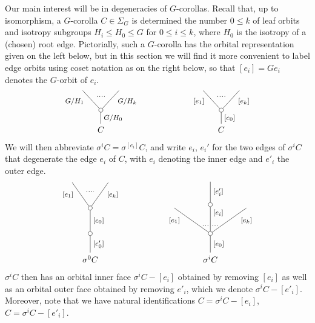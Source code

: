 \documentclass[a4paper,10pt
,draft
]{article}%
\renewcommand{\1}{\eta}%
\begin{document}
Our main interest will be in degeneracies of $G$-corollas. Recall that, up to isomorphism, 
a $G$-corolla $C \in \Sigma_G$ is determined the number $0 \leq k$ of leaf orbits
and isotropy subgroups
$H_i \leq H_0 \leq G$ for $0 \leq i \leq k$,
where $H_0$ is the isotropy of a (chosen) root edge.
Pictorially, such a $G$-corolla has the orbital representation given on the left below,
but in this section we will find it more convenient to label edge orbits using coset notation as on the right below,
so that $[e_i] = G e_i$ denotes the $G$-orbit of $e_i$.
\[
\begin{tikzpicture}
[grow=up,auto,level distance=2.3em,every node/.style = {font=\footnotesize},dummy/.style={circle,draw,inner sep=0pt,minimum size=1.75mm}]
	\node at (0,0) [font=\normalsize]{$C$}
		child{node [dummy] {}
			child{
			edge from parent node [swap,near end] {$G/H_k$} node [name=Kn] {}}
			child{
			edge from parent node [near end] {$G/H_1$}
node [name=Kone,swap] {}}
		edge from parent node [swap] {$G/H_0$}
		};
		\draw [dotted,thick] (Kone) -- (Kn) ;
	\node at (5,0) [font=\normalsize]{$C$}
		child{node [dummy] {}
			child{
			edge from parent node [swap,near end] {$[e_k]$} node [name=Kn] {}}
			child{
			edge from parent node [near end] {$[e_1]$}
node [name=Kone,swap] {}}
		edge from parent node [swap] {$[e_0]$}
		};
		\draw [dotted,thick] (Kone) -- (Kn) ;
\end{tikzpicture}
\]
We will then abbreviate $\sigma^i C = \sigma^{[e_i]} C$, and write $e_i$, $e_i'$ for the two edges of $\sigma^i C $ that degenerate the edge $e_i$ of $C$,
with $e_i$ denoting the inner edge and $e'_i$ the outer
edge.
\[
\begin{tikzpicture}
[grow=up,auto,level distance=3em,
every node/.style = {font=\footnotesize},
dummy/.style={circle,draw,inner sep=0pt,minimum size=1.75mm}]
	\node at (0,0) [font=\normalsize]{$\sigma^0 C$}
		child{node [dummy] {}
			child{node [dummy] {}
				child{
				edge from parent node [swap,near end] {$[e_k]$} node [name=Kn] {}}
				child{
				edge from parent node [near end] {$[e_1]$}
node [name=Kone,swap] {}}
			edge from parent node [swap] {$[e_0]$}}
		edge from parent node [swap] {$[e'_0]$}
		};
		\draw [dotted,thick] (Kone) -- (Kn) ;
	\node at (5,0) [font=\normalsize]{$\sigma^i C$}
		child{node [dummy] {}
			child{
			edge from parent node [swap,near end] {$[e_k]$} node [near start,inner sep=1pt,name=Kn] {}}
			child[level distance=3.4em]{node [dummy] {}
				child[level distance=2.7em]{
				edge from parent node [swap] {$[e'_i]$}
}
			edge from parent node [near end,swap] {$[e_i]$}
node [near start,inner sep=1pt,name=Kone,swap] {}
node [near start,inner sep=1pt,name=Kone1] {}}
			child{
			edge from parent node [near end] {$[e_1]$}
node [swap] {}
node [near start,inner sep=1pt,name=Kn1,swap]{}}
		edge from parent node [swap] {$[e_0]$}
		};
		\draw [dotted,thick] (Kone) -- (Kn) ;
		\draw [dotted,thick] (Kone1) -- (Kn1) ;
\end{tikzpicture}
\]
$\sigma^i C$ then has an orbital inner face
$\sigma^i C - [e_i]$ obtained by removing $[e_i]$
as well as an orbital outer face obtained by removing $e'_i$,
which we denote $\sigma^i C - [e'_i]$.
Moreover, note that we have natural identifications
$C = \sigma^i C - [e_i]$,
$C = \sigma^i C - [e'_i]$.
\end{document}
